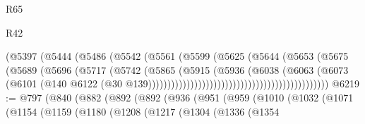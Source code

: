 \begin{lexlean}{R65}
\begin{lexlean}{R42}
\begin{coremodule}
{{{{{{{{{{{{{{{{{{{{{{{{{{{{{{{{{{{{{{{{{{{{{{{{{{{{{{{{{{{{{{{{{{{{{{{{{{{{{{{{{{{{{{{{{{{{{{{{{{{{{{{{{{{{{{{{{{{{{{{{{{{{{{{{{{{{{{{{{{{{{{{{{{{{{{{{{{{{{{{{{{{{{{{{{{{{{{{{{{{{{{{{                                                    (@5397
                                                      (@5444
                                                        (@5486
                                                          (@5542
                                                            (@5561
                                                              (@5599
                                                                (@5625
                                                                  (@5644
                                                                    (@5653
                                                                      (@5675
                                                                        (@5689
                                                                          (@5696
                                                                            (@5717
                                                                              (@5742
                                                                                (@5865
                                                                                  (@5915
                                                                                    (@5936
                                                                                      (@6038
                                                                                        (@6063
                                                                                          (@6073
                                                                                            (@6101
                                                                                              (@140
                                                                                                @6122
                                                                                                (@30
                                                                                                  @139)))))))))))))))))))))))))))))))))))))))))))))))
@6219 := @797
    (@840
      (@882
        (@892
          (@892
            (@936
              (@951
                (@959
                  (@1010
                    (@1032
                      (@1071
                        (@1154
                          (@1159
                            (@1180
                              (@1208
                                (@1217
                                  (@1304
                                    (@1336
                                      (@1354
}}}}}}}}}}}}}}}}}}}}}}}}}}}}}}}}}}}}}}}}}}}}}}}}}}}}}}}}}}}}}}}}}}}}}}}}}}}}}}}}}}}}}}}}}}}}}}}}}}}}}}}}}}}}}}}}}}}}}}}}}}}}}}}}}}}}}}}}}}}}}}}}}}}}}}}}}}}}}}}}}}}}}}}}}}}}}}}}}}}}}}}}
\end{coremodule}
\end{lexlean}
\end{lexlean}
